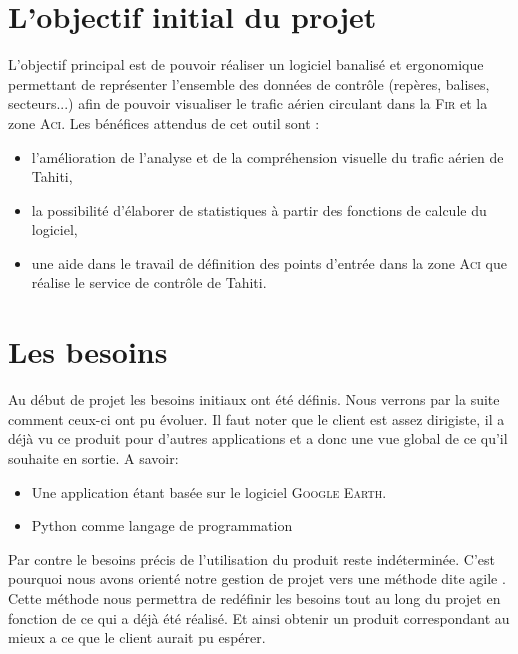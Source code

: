  
\section{L'objectif initial du projet}
L’objectif principal est de pouvoir réaliser un logiciel banalisé et ergonomique permettant de
représenter l’ensemble des données de contrôle (repères, balises, secteurs...) afin de pouvoir
visualiser le trafic aérien circulant dans la \textsc{Fir} et la zone \textsc{Aci}.
Les bénéfices attendus de cet outil sont :
\begin{itemize}
\item l’amélioration de l’analyse et de la compréhension visuelle du trafic aérien de Tahiti,
\item la possibilité d’élaborer de statistiques à partir des fonctions de calcule du logiciel,
\item une aide dans le travail de définition des points d’entrée dans la zone \textsc{Aci} que réalise le
service de contrôle de Tahiti.
\end{itemize}\medskip

\section{Les besoins}
Au début de projet les besoins initiaux ont été définis. Nous verrons par la suite comment ceux-ci ont pu évoluer. Il faut noter que le client est assez dirigiste, il a déjà vu ce produit pour d'autres applications et a donc une vue global de ce qu'il souhaite en sortie. A savoir:
\begin{itemize}
    \item Une application étant basée sur le logiciel \textsc{Google Earth}.
    \item Python comme langage de programmation
\end{itemize}\medskip
Par contre le besoins précis de l'utilisation du produit reste indéterminée. C'est pourquoi nous avons orienté notre gestion de projet vers une méthode dite agile . Cette méthode nous permettra de redéfinir les besoins tout au long du projet en fonction de ce qui a déjà été réalisé. Et ainsi obtenir un produit correspondant au mieux a ce que le client aurait pu espérer.

